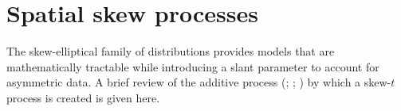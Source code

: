 \documentclass[useAMS,usenatbib,referee]{biom}
\begin{document}

\section{Spatial skew processes}\label{sts:spatialskew}
The skew-elliptical family of distributions provides models that are mathematically tractable while introducing a slant parameter to account for asymmetric data.
A brief review of the additive process (\citealp{Azzalini2003}; \citealp[p. 129]{Azzalini2014}; \citealp{Beranger2016}) by which a skew-$t$ process is created is given here.
\end{document}
